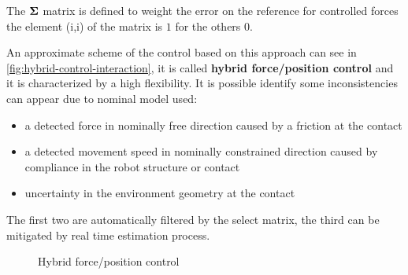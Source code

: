 The $\boldsymbol{\Sigma}$ matrix is defined to weight the error on the reference for controlled forces the element (i,i) of the matrix is $1$ for the others $0$.

An approximate scheme of the control based on this approach can see in \autoref{fig:hybrid-control-interaction}, it is called \textbf{hybrid force/position control} and it is characterized by a high flexibility.
It is possible identify some inconsistencies can appear due to nominal model used:

\begin{itemize}
	\item a detected force in nominally free direction caused by a friction at the contact
	\item a detected movement speed in nominally constrained direction caused by compliance in the robot structure or contact
	\item uncertainty in the environment geometry at the contact
\end{itemize}

The first two are automatically filtered by the select matrix, the third can be mitigated by real time estimation process.

\begin{figure}[htb]
	\centering
	\caption{Hybrid force/position control}
	\label{fig:hybrid-control-interaction}
\end{figure}
